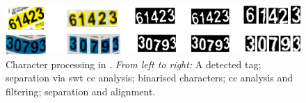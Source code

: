 \begin{figure}[h]
  \centering
  \includegraphics[width=\textwidth]{images/background/benami2012_cctags}
  \caption[Character processing for feeding an OCR engine]{Character processing in \citep{Benami:2012jf}. \textit{From left to right:} A detected tag; separation via \gls{swt} \gls{cc} analysis; binarised characters; \gls{cc} analysis and filtering; separation and alignment.}
  \label{fig:background:recognition:benami2012_cctags}
\end{figure}

\newpage
